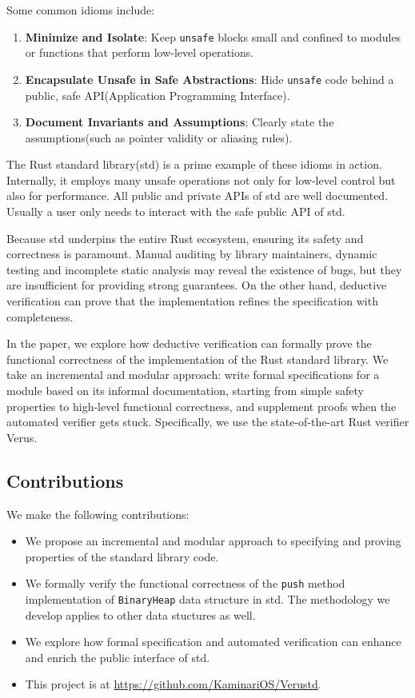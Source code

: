 \documentclass[conference]{IEEEtran}
\begin{document}
Some common idioms include:
\begin{enumerate}
    \item \textbf{Minimize and Isolate}: Keep \texttt{unsafe} blocks small and confined to modules or functions that perform low-level operations. 
    \item \textbf{Encapsulate Unsafe in Safe Abstractions}: Hide \texttt{unsafe} code behind a public, safe API(Application Programming Interface). 
    \item \textbf{Document Invariants and Assumptions}: Clearly state the assumptions(such as pointer validity or aliasing rules). 
\end{enumerate}


The Rust standard library(std) is a prime example of these idioms in action. Internally, it employs many unsafe operations not only for low-level control but also for performance. All public and private APIs of std are well documented. Usually a user only needs to interact with the safe public API of std.  


Because std underpins the entire Rust ecosystem, ensuring its safety and correctness is paramount. Manual auditing by library maintainers, dynamic testing and incomplete static analysis may reveal the existence of bugs, but they are insufficient for providing strong guarantees. On the other hand, deductive verification can prove that the implementation refines the specification with completeness.           


In the paper, we explore how deductive verification can formally prove the functional correctness of the implementation of the Rust standard library. We take an incremental and modular approach: write formal specifications for a module based on its informal documentation, starting from simple safety properties to high-level functional correctness, and supplement proofs when the automated verifier gets stuck. Specifically, we use the state-of-the-art Rust verifier Verus\cite{verus}. 

\subsection{Contributions}
We make the following contributions:
\begin{itemize}
        \item We propose an incremental and modular approach to specifying and proving properties of the standard library code.
        \item We formally verify the functional correctness of the \texttt{push} method implementation of \texttt{BinaryHeap} data structure in std. The methodology we develop applies to other data stuctures as well.
        \item We explore how formal specification and automated verification can enhance and enrich the public interface of std. 
        \item This project is at \href{https://github.com/KaminariOS/Verustd}{https://github.com/KaminariOS/Verustd}.
\end{itemize}
        
\end{document}
